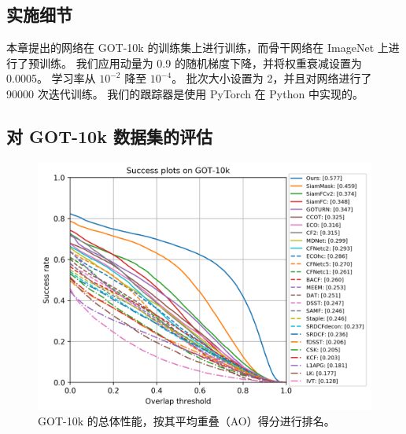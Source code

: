 \subsection{实施细节}
本章提出的网络在 GOT-10k \cite{GOT-10k} 的训练集上进行训练，而骨干网络在 ImageNet 上进行了预训练。
我们应用动量​​为 0.9 的随机梯度下降，并将权重衰减设置为 0.0005。
学习率从 $10^{-2}$ 降至 $10^{-4}$。
批次大小设置为 2，并且对网络进行了 90000 次迭代训练。
我们的跟踪器是使用 PyTorch 在 Python 中实现的。
\subsection{对 GOT-10k 数据集的评估}

\begin{figure}[t]
    \centering
    \includegraphics[width=1\textwidth]{Img/end/success_plot.png}
    \caption{GOT-10k 的总体性能，按其平均重叠（AO）得分进行排名。}
    \label{fig:got10k}
\end{figure}

